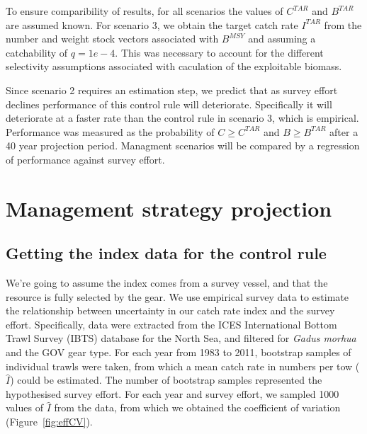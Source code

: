 \documentclass[a4paper]{article}
\begin{document}
To ensure comparibility of results, for all scenarios the values of $C^{TAR}$ and $B^{TAR}$ are assumed known. 
For scenario 3, we obtain the target catch rate $I^{TAR}$ from the number and weight stock vectors associated with
$B^{MSY}$ and assuming a catchability of $q=1e-4$. This was necessary to account for the different selectivity
assumptions associated with caculation of the exploitable biomass. 

Since scenario 2 requires an estimation step, we predict that as survey effort declines performance of this control rule will deteriorate.
Specifically it will deteriorate at a faster rate than the control rule in scenario 3, which is empirical. Performance was measured as the 
probability of $C\geq C^{TAR}$ and $B\geq B^{TAR}$ after a 40 year projection period. Managment scenarios will be compared by a regression of 
performance against survey effort. 

\section{Management strategy projection}


\subsection{Getting the index data for the control rule}

We're going to assume the index comes from a survey vessel, and that the resource is fully selected by the gear. 
We use empirical survey data to estimate the relationship between uncertainty in our catch rate index and the survey effort. Specifically, data
were extracted from the ICES International Bottom Trawl Survey (IBTS) database for the North Sea, and filtered for \textit{Gadus morhua} and the GOV gear type.
For each year from 1983 to 2011, bootstrap samples of individual trawls were taken, from which a mean catch rate in numbers per tow ($\hat{I}$) could
be estimated. The number of bootstrap samples represented the hypothesised survey effort. For each year and survey effort, we sampled 1000 values of $\hat{I}$
from the data, from which we obtained the coefficient of variation (Figure~\ref{fig:effCV}).
\end{document}
